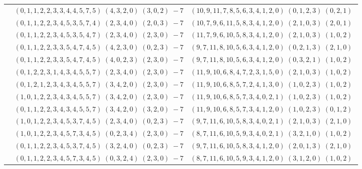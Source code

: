 \documentclass[11pt]{article}
\begin{document}
\begin{longtable}[l]{|c|c|c|}
 \cline{2-3} 
 & $(0 ,1 ,1 ,2 ,2 ,3 ,3 ,4 ,4 ,5 ,7 ,5) \;(4 ,3 ,2 ,0) \;(3 ,0 ,2) \;-7$ & $(10 ,9 ,11 ,7 ,8 ,5 ,6 ,3 ,4 ,1 ,2 ,0) \;(0 ,1 ,2 ,3) \;(0 ,2 ,1) \;$\\ 
 \cline{2-3} 
 & $(0 ,1 ,1 ,2 ,2 ,3 ,4 ,5 ,3 ,5 ,7 ,4) \;(2 ,3 ,4 ,0) \;(2 ,0 ,3) \;-7$ & $(10 ,7 ,9 ,6 ,11 ,5 ,8 ,3 ,4 ,1 ,2 ,0) \;(2 ,1 ,0 ,3) \;(2 ,0 ,1) \;$\\ 
 \cline{2-3} 
 & $(0 ,1 ,1 ,2 ,2 ,3 ,4 ,5 ,3 ,5 ,4 ,7) \;(2 ,3 ,4 ,0) \;(2 ,3 ,0) \;-7$ & $(11 ,7 ,9 ,6 ,10 ,5 ,8 ,3 ,4 ,1 ,2 ,0) \;(2 ,1 ,0 ,3) \;(1 ,0 ,2) \;$\\ 
 \cline{2-3} 
 & $(0 ,1 ,1 ,2 ,2 ,3 ,3 ,5 ,4 ,7 ,4 ,5) \;(4 ,2 ,3 ,0) \;(0 ,2 ,3) \;-7$ & $(9 ,7 ,11 ,8 ,10 ,5 ,6 ,3 ,4 ,1 ,2 ,0) \;(0 ,2 ,1 ,3) \;(2 ,1 ,0) \;$\\ 
 \cline{2-3} 
 & $(0 ,1 ,1 ,2 ,2 ,3 ,3 ,5 ,4 ,7 ,4 ,5) \;(4 ,0 ,2 ,3) \;(2 ,3 ,0) \;-7$ & $(9 ,7 ,11 ,8 ,10 ,5 ,6 ,3 ,4 ,1 ,2 ,0) \;(0 ,3 ,2 ,1) \;(1 ,0 ,2) \;$\\ 
 \cline{2-3} 
 & $(0 ,1 ,2 ,2 ,3 ,1 ,4 ,3 ,4 ,5 ,5 ,7) \;(2 ,3 ,4 ,0) \;(2 ,3 ,0) \;-7$ & $(11 ,9 ,10 ,6 ,8 ,4 ,7 ,2 ,3 ,1 ,5 ,0) \;(2 ,1 ,0 ,3) \;(1 ,0 ,2) \;$\\ 
 \cline{2-3} 
 & $(0 ,1 ,2 ,1 ,2 ,3 ,4 ,3 ,4 ,5 ,5 ,7) \;(3 ,4 ,2 ,0) \;(2 ,3 ,0) \;-7$ & $(11 ,9 ,10 ,6 ,8 ,5 ,7 ,2 ,4 ,1 ,3 ,0) \;(1 ,0 ,2 ,3) \;(1 ,0 ,2) \;$\\ 
 \cline{2-3} 
 & $(1 ,0 ,1 ,2 ,2 ,3 ,4 ,3 ,4 ,5 ,5 ,7) \;(3 ,4 ,2 ,0) \;(2 ,3 ,0) \;-7$ & $(11 ,9 ,10 ,6 ,8 ,5 ,7 ,3 ,4 ,0 ,2 ,1) \;(1 ,0 ,2 ,3) \;(1 ,0 ,2) \;$\\ 
 \cline{2-3} 
 & $(0 ,1 ,1 ,2 ,2 ,3 ,4 ,3 ,4 ,5 ,5 ,7) \;(3 ,4 ,2 ,0) \;(3 ,2 ,0) \;-7$ & $(11 ,9 ,10 ,6 ,8 ,5 ,7 ,3 ,4 ,1 ,2 ,0) \;(1 ,0 ,2 ,3) \;(0 ,1 ,2) \;$\\ 
 \cline{2-3} 
 & $(1 ,0 ,1 ,2 ,2 ,3 ,4 ,5 ,3 ,7 ,4 ,5) \;(2 ,3 ,4 ,0) \;(0 ,2 ,3) \;-7$ & $(9 ,7 ,11 ,6 ,10 ,5 ,8 ,3 ,4 ,0 ,2 ,1) \;(2 ,1 ,0 ,3) \;(2 ,1 ,0) \;$\\ 
 \cline{2-3} 
 & $(1 ,0 ,1 ,2 ,2 ,3 ,4 ,5 ,7 ,3 ,4 ,5) \;(0 ,2 ,3 ,4) \;(2 ,3 ,0) \;-7$ & $(8 ,7 ,11 ,6 ,10 ,5 ,9 ,3 ,4 ,0 ,2 ,1) \;(3 ,2 ,1 ,0) \;(1 ,0 ,2) \;$\\ 
 \cline{2-3} 
 & $(0 ,1 ,1 ,2 ,2 ,3 ,4 ,5 ,3 ,7 ,4 ,5) \;(3 ,2 ,4 ,0) \;(0 ,2 ,3) \;-7$ & $(9 ,7 ,11 ,6 ,10 ,5 ,8 ,3 ,4 ,1 ,2 ,0) \;(2 ,0 ,1 ,3) \;(2 ,1 ,0) \;$\\ 
 \cline{2-3} 
 & $(0 ,1 ,1 ,2 ,2 ,3 ,4 ,5 ,7 ,3 ,4 ,5) \;(0 ,3 ,2 ,4) \;(2 ,3 ,0) \;-7$ & $(8 ,7 ,11 ,6 ,10 ,5 ,9 ,3 ,4 ,1 ,2 ,0) \;(3 ,1 ,2 ,0) \;(1 ,0 ,2) \;$\\ 

\end{longtable}
\end{document}
